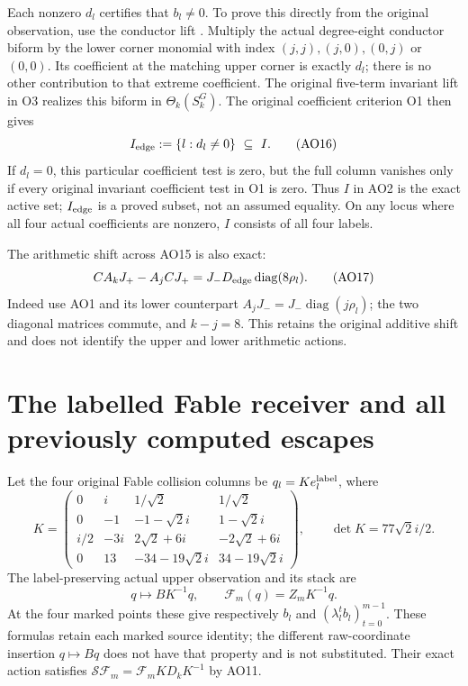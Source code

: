 \documentclass[11pt]{article}
\newcommand{\diag}{\operatorname{diag}}
\begin{document}
Each nonzero $d_l$ certifies that $b_l\ne0$. To prove this
directly from the original observation, use the conductor
lift \cite[O3]{Observe}. Multiply the actual degree-eight
conductor biform by the lower corner monomial with index
$(j,j),(j,0),(0,j)$ or $(0,0)$. Its coefficient at the matching
upper corner is exactly $d_l$; there is no other contribution
to that extreme coefficient. The original five-term invariant
lift in O3 realizes this biform in $\Theta_k(S_k^G)$.
The original coefficient criterion O1 then gives
\begin{equation}
 I_{\rm edge}:=\{l:d_l\ne0\}\ \subseteq\ I.\tag{AO16}
\end{equation}
If $d_l=0$, this particular coefficient test is zero, but the
full column vanishes only if every original invariant
coefficient test in O1 is zero. Thus $I$ in AO2 is the exact
active set; $I_{\rm edge}$ is a proved subset, not an assumed
equality. On any locus where all four actual coefficients
are nonzero, $I$ consists of all four labels.

The arithmetic shift across AO15 is also exact:
\begin{equation}
 C A_kJ_+-A_j C J_+
       =J_-D_{\rm edge}\diag(8\rho_l).\tag{AO17}
\end{equation}
Indeed use AO1 and its lower counterpart
$A_jJ_-=J_-\diag(j\rho_l)$; the two diagonal matrices commute,
and $k-j=8$. This retains the original additive shift and
does not identify the upper and lower arithmetic actions.

\section{The labelled Fable receiver and all previously computed escapes}
Let the four original Fable collision columns be $q_l=Ke_l^{\rm label}$,
where
\[
 K=\begin{pmatrix}
 0&i&1/\sqrt2&1/\sqrt2\\
 0&-1&-1-\sqrt2i&1-\sqrt2i\\
 i/2&-3i&2\sqrt2+6i&-2\sqrt2+6i\\
 0&13&-34-19\sqrt2i&34-19\sqrt2i
 \end{pmatrix},\qquad \det K=77\sqrt2i/2.
\]
The label-preserving actual upper observation and its stack are
\begin{equation}
 q\longmapsto BK^{-1}q,\qquad
 \mathcal F_m(q)=Z_mK^{-1}q.\tag{AO18}
\end{equation}
At the four marked points these give respectively $b_l$ and
$(\lambda_l^t b_l)_{t=0}^{m-1}$. These formulas retain each
marked source identity; the different raw-coordinate insertion
$q\mapsto Bq$ does not have that property and is not substituted.
Their exact action satisfies
$\mathcal S\mathcal F_m=\mathcal F_m K D_kK^{-1}$ by AO11.
\end{document}

